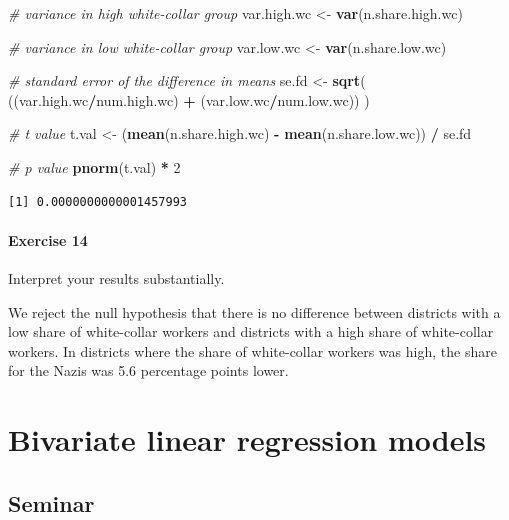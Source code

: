 \documentclass[]{article}
\newenvironment{Shaded}{\begin{snugshade}}{\end{snugshade}}
\newcommand{\KeywordTok}[1]{\textcolor[rgb]{0.13,0.29,0.53}{\textbf{#1}}}
\newcommand{\DecValTok}[1]{\textcolor[rgb]{0.00,0.00,0.81}{#1}}
\newcommand{\StringTok}[1]{\textcolor[rgb]{0.31,0.60,0.02}{#1}}
\newcommand{\CommentTok}[1]{\textcolor[rgb]{0.56,0.35,0.01}{\textit{#1}}}
\newcommand{\OperatorTok}[1]{\textcolor[rgb]{0.81,0.36,0.00}{\textbf{#1}}}
\newcommand{\NormalTok}[1]{#1}
\let\oldparagraph\paragraph
\renewcommand{\paragraph}[1]{\oldparagraph{#1}\mbox{}}
\theoremstyle{definition}
\theoremstyle{definition}
\theoremstyle{definition}
\theoremstyle{remark}
\begin{document}
\begin{Shaded}
\begin{Highlighting}[]
\CommentTok{# variance in high white-collar group}
\NormalTok{var.high.wc <-}\StringTok{ }\KeywordTok{var}\NormalTok{(n.share.high.wc)}

\CommentTok{# variance in low white-collar group}
\NormalTok{var.low.wc <-}\StringTok{ }\KeywordTok{var}\NormalTok{(n.share.low.wc)}


\CommentTok{# standard error of the difference in means}
\NormalTok{se.fd <-}\StringTok{ }\KeywordTok{sqrt}\NormalTok{( ((var.high.wc}\OperatorTok{/}\NormalTok{num.high.wc) }\OperatorTok{+}\StringTok{ }\NormalTok{(var.low.wc}\OperatorTok{/}\NormalTok{num.low.wc))   )}

\CommentTok{# t value}
\NormalTok{t.val <-}\StringTok{ }\NormalTok{(}\KeywordTok{mean}\NormalTok{(n.share.high.wc) }\OperatorTok{-}\StringTok{ }\KeywordTok{mean}\NormalTok{(n.share.low.wc)) }\OperatorTok{/}\StringTok{ }\NormalTok{se.fd}

\CommentTok{# p value}
\KeywordTok{pnorm}\NormalTok{(t.val) }\OperatorTok{*}\StringTok{ }\DecValTok{2}
\end{Highlighting}
\end{Shaded}

\begin{verbatim}
[1] 0.0000000000001457993
\end{verbatim}

\paragraph{Exercise 14}\label{exercise-14-1}

Interpret your results substantially.

We reject the null hypothesis that there is no difference between
districts with a low share of white-collar workers and districts with a
high share of white-collar workers. In districts where the share of
white-collar workers was high, the share for the Nazis was 5.6
percentage points lower.

\section{Bivariate linear regression
models}\label{bivariate-linear-regression-models}

\subsection{Seminar}\label{seminar-5}
\end{document}
